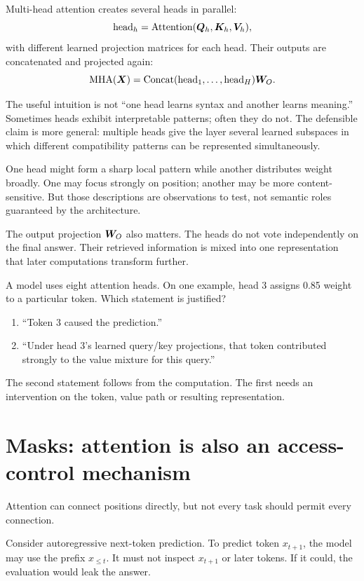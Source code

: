 Multi-head attention creates several heads in parallel:
\[
  \mathrm{head}_h
  = \mathrm{Attention}(\bm{Q}_h,\bm{K}_h,\bm{V}_h),
\]
with different learned projection matrices for each head. Their outputs are concatenated and projected again:
\[
  \mathrm{MHA}(\bm{X})
  = \mathrm{Concat}(\mathrm{head}_1,\ldots,\mathrm{head}_H)\bm{W}_O.
\]

The useful intuition is not ``one head learns syntax and another learns meaning.'' Sometimes heads exhibit interpretable patterns; often they do not. The defensible claim is more general: multiple heads give the layer several learned subspaces in which different compatibility patterns can be represented simultaneously.

One head might form a sharp local pattern while another distributes weight broadly. One may focus strongly on position; another may be more content-sensitive. But those descriptions are observations to test, not semantic roles guaranteed by the architecture.

The output projection \(\bm{W}_O\) also matters. The heads do not vote independently on the final answer. Their retrieved information is mixed into one representation that later computations transform further.

\begin{checkpointbox}
A model uses eight attention heads. On one example, head 3 assigns 0.85 weight to a particular token. Which statement is justified?

\begin{enumerate}[leftmargin=*]
  \item ``Token 3 caused the prediction.''
  \item ``Under head 3's learned query/key projections, that token contributed strongly to the value mixture for this query.''
\end{enumerate}
The second statement follows from the computation. The first needs an intervention on the token, value path or resulting representation.
\end{checkpointbox}

\section{Masks: attention is also an access-control mechanism}

Attention can connect positions directly, but not every task should permit every connection.

Consider autoregressive next-token prediction. To predict token \(x_{t+1}\), the model may use the prefix \(x_{\le t}\). It must not inspect \(x_{t+1}\) or later tokens. If it could, the evaluation would leak the answer.

